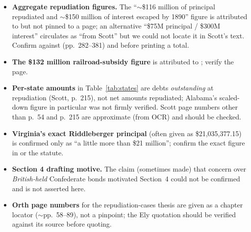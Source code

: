 \documentclass[12pt]{article}
\begin{document}
\begin{itemize}
  \item \textbf{Aggregate repudiation figures.} The ``$\sim$\$116 million of
    principal repudiated and $\sim$\$150 million of interest escaped by 1890'' figure
    is attributed to \citet{white2017republic} but not pinned to a page; an
    alternative ``\$75M principal / \$300M interest'' circulates as ``from Scott''
    but we could not locate it in Scott's text. Confirm against \citet{mcgrane1935foreign}
    (pp.~282--381) and \citet{ratchford1941american} before printing a total.
  \item \textbf{The \$132 million railroad-subsidy figure} is attributed to
    \citet{white2017republic}; verify the page.
  \item \textbf{Per-state amounts} in Table~\ref{tab:states} are debts
    \emph{outstanding} at repudiation (Scott, p.~215), not net amounts repudiated;
    Alabama's scaled-down figure in particular was not firmly verified. Scott page
    numbers other than p.~54 and p.~215 are approximate (from OCR) and should be
    checked.
  \item \textbf{Virginia's exact Riddleberger principal} (often given as
    \$21,035,377.15) is confirmed only as ``a little more than \$21 million'';
    confirm the exact figure in \citet{moore1974twopaths} or the statute.
  \item \textbf{Section 4 drafting motive.} The claim (sometimes made) that concern
    over \emph{British-held} Confederate bonds motivated Section~4 could not be
    confirmed and is not asserted here.
  \item \textbf{Orth page numbers} for the repudiation-cases thesis are given as a
    chapter locator ($\sim$pp.~58--89), not a pinpoint; the Ely quotation should be
    verified against its source before quoting.
\end{itemize}



\end{document}
